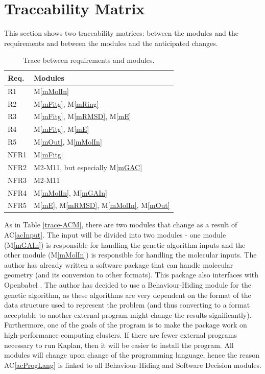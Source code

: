 \documentclass[12pt, titlepage]{article}
\newcommand{\acref}[1]{AC\ref{#1}}
\newcommand{\mref}[1]{M\ref{#1}}
\newcommand{\progname}{Kaplan} %
\begin{document}
\section{Traceability Matrix} \label{SecTM}

This section shows two traceability matrices: between the modules and the
requirements and between the modules and the anticipated changes.

\begin{table}[H]
\centering
\begin{tabular}{p{} p{}}
\toprule
\textbf{Req.} & \textbf{Modules}\\
\midrule
R1 & \mref{mMolIn} \\
R2 & \mref{mFitg}, \mref{mRing} \\
R3 & \mref{mFitg}, \mref{mRMSD}, \mref{mE} \\
R4 & \mref{mFitg}, \mref{mE} \\
R5 & \mref{mOut}, \mref{mMolIn} \\
NFR1 & \mref{mFitg} \\
NFR2 & M2-M11, but especially \mref{mGAC} \\
NFR3 & M2-M11 \\
NFR4 & \mref{mMolIn}, \mref{mGAIn} \\
NFR5 & \mref{mE}, \mref{mRMSD}, \mref{mMolIn}, \mref{mOut} \\
\bottomrule
\end{tabular}
\caption{Trace between requirements and modules.}
\label{TblRT}
\end{table}

As in Table \ref{trace-ACM}, there are two modules that change as a result of 
\acref{acInput}. The input will be divided into two modules - one module 
(\mref{mGAIn}) is responsible for handling the genetic algorithm inputs and the 
other module (\mref{mMolIn}) is responsible for handling the molecular inputs. 
The author has already written a software package that can handle molecular 
geometry (and its conversion to other formats). This package also interfaces 
with Openbabel \cite{obabel}. The author has decided to use a Behaviour-Hiding 
module for the genetic algorithm, as these algorithms are very dependent on the 
format of the data structure used to represent the problem (and thus converting 
to a format acceptable to another external program might change the results 
significantly). Furthermore, one of the goals of the program is to make the 
package work on high-performance computing clusters. If there are fewer 
external programs necessary to run \progname{}, then it will be easier to 
install the program. All modules will change upon change of the programming 
language, hence the reason \acref{acProgLang} is linked to all Behaviour-Hiding 
and Software Decision modules.
\end{document}
